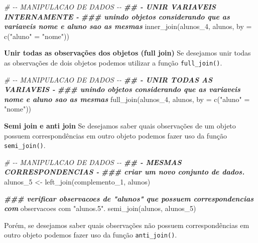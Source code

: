 \documentclass[
]{book}
\newenvironment{Shaded}{\begin{snugshade}}{\end{snugshade}}
\newcommand{\AttributeTok}[1]{\textcolor[rgb]{0.77,0.63,0.00}{#1}}
\newcommand{\CommentTok}[1]{\textcolor[rgb]{0.56,0.35,0.01}{\textit{#1}}}
\newcommand{\DocumentationTok}[1]{\textcolor[rgb]{0.56,0.35,0.01}{\textbf{\textit{#1}}}}
\newcommand{\FunctionTok}[1]{\textcolor[rgb]{0.00,0.00,0.00}{#1}}
\newcommand{\NormalTok}[1]{#1}
\newcommand{\OtherTok}[1]{\textcolor[rgb]{0.56,0.35,0.01}{#1}}
\newcommand{\StringTok}[1]{\textcolor[rgb]{0.31,0.60,0.02}{#1}}
\begin{document}
\begin{Shaded}
\begin{Highlighting}[]
\CommentTok{\# {-}{-} MANIPULACAO DE DADOS {-}{-}}
\DocumentationTok{\#\# {-} UNIR VARIAVEIS INTERNAMENTE {-}}
\DocumentationTok{\#\#\# unindo objetos considerando que as variaveis nome e aluno sao as mesmas}
\FunctionTok{inner\_join}\NormalTok{(alunos\_4, alunos, }\AttributeTok{by =} \FunctionTok{c}\NormalTok{(}\StringTok{"aluno"} \OtherTok{=} \StringTok{"nome"}\NormalTok{))}
\end{Highlighting}
\end{Shaded}

\textbf{Unir todas as observações dos objetos (full join)}
Se desejamos unir todas as observações de dois objetos podemos utilizar a função \texttt{full\_join()}.

\begin{Shaded}
\begin{Highlighting}[]
\CommentTok{\# {-}{-} MANIPULACAO DE DADOS {-}{-}}
\DocumentationTok{\#\# {-} UNIR TODAS AS VARIAVEIS {-}}
\DocumentationTok{\#\#\# unindo objetos considerando que as variaveis nome e aluno sao as mesmas}
\FunctionTok{full\_join}\NormalTok{(alunos\_4, alunos, }\AttributeTok{by =} \FunctionTok{c}\NormalTok{(}\StringTok{"aluno"} \OtherTok{=} \StringTok{"nome"}\NormalTok{))}
\end{Highlighting}
\end{Shaded}

\textbf{Semi join e anti join}
Se desejamos saber quais observações de um objeto possuem correspondências em outro objeto podemos fazer uso da função \texttt{semi\_join()}.

\begin{Shaded}
\begin{Highlighting}[]
\CommentTok{\# {-}{-} MANIPULACAO DE DADOS {-}{-}}
\DocumentationTok{\#\# {-} MESMAS CORRESPONDENCIAS {-}}
\DocumentationTok{\#\#\# criar um novo conjunto de dados.}
\NormalTok{alunos\_5 }\OtherTok{\textless{}{-}} \FunctionTok{left\_join}\NormalTok{(complemento\_1, alunos)}

\DocumentationTok{\#\#\# verificar observacoes de "alunos" que possuem correspondencias com}
\NormalTok{observacoes com }\StringTok{"alunos.5"}\NormalTok{.}
\FunctionTok{semi\_join}\NormalTok{(alunos, alunos\_5)}
\end{Highlighting}
\end{Shaded}

Porém, se desejamos saber quais observações não possuem correspondências em outro objeto podemos fazer uso da função \texttt{anti\_join()}.
\end{document}
